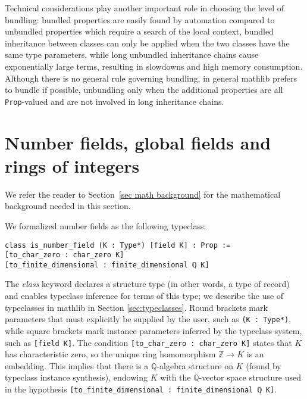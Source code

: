 \documentclass[sn-mathphys]{sn-jnl}%
\newcommand{\lean}[1]{\texttt{#1}\xspace}
\newcommand{\mathlib}{\textsf{mathlib}\xspace}
\newcommand{\QQ}{\mathbb{Q}}
\renewcommand{\Z}{\mathbb{Z}}
\begin{document}
Technical considerations play another important role in choosing the level of bundling:
bundled properties are easily found by automation compared to unbundled properties which require a search of the local context,
bundled inheritance between classes can only be applied when the two classes have the same type parameters,
while long unbundled inheritance chains cause exponentially large terms, resulting in slowdowns and high memory consumption.
Although there is no general rule governing bundling, in general \mathlib prefers to bundle if possible,
unbundling only when the additional properties are all \lean{Prop}-valued and are not involved in long inheritance chains.

\section{Number fields, global fields and rings of integers} \label{sec:number fields}

We refer the reader to Section~\ref{sec math background} for the mathematical background needed in this section.

We formalized number fields as the following typeclass:
\begin{lstlisting}
class is_number_field (K : Type*) [field K] : Prop :=
[to_char_zero : char_zero K]
[to_finite_dimensional : finite_dimensional ℚ K]
\end{lstlisting}
The \emph{class} keyword declares a structure type (in other words, a type of record) and enables typeclass inference for terms of this type;
we describe the use of typeclasses in \mathlib in Section \ref{sec:typeclasses}.
Round brackets mark parameters that must explicitly be supplied by the user, such as \lean{(K : Type*)}, while
square brackets mark instance parameters inferred by the typeclass system, such as \mbox{\lean{[field K]}}.
The condition \lean{[to\_char\_zero : char\_zero K]} states that $K$ has characteristic zero, so the unique ring homomorphism $\Z \to K$ is an embedding.
This implies that there is a $\QQ$-algebra structure on $K$ (found by typeclass instance synthesis), endowing $K$ with the $\QQ$-vector space structure used in the hypothesis \mbox{\lean{[to\_finite\_dimensional : finite\_dimensional ℚ K]}}.
\end{document}
